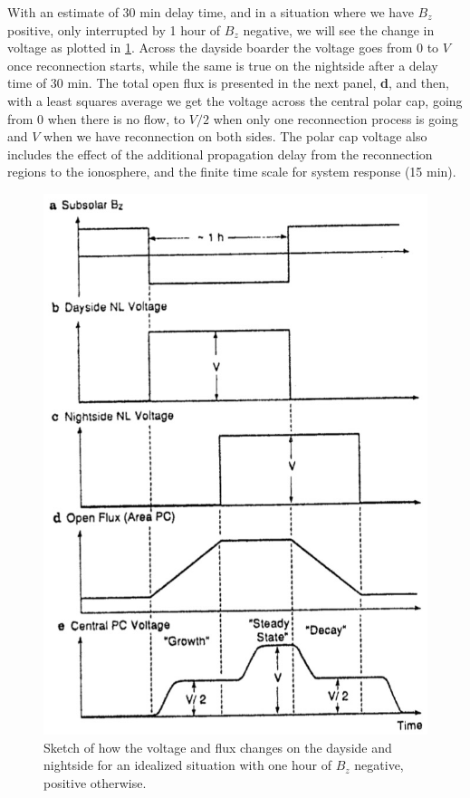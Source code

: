 With an estimate of 30 min delay time, and in a situation where we have \(B_z\) positive, only interrupted by 1 hour of \(B_z\) negative, we will see the change in voltage as plotted in \cref{fig:L13_voltage_dependance_flux_flow}. Across the dayside boarder the voltage goes from 0 to \(V\) once reconnection starts, while the same is true on the nightside after a delay time of 30 min. The total open flux is presented in the next panel, \textbf{d}, and then, with a least squares average we get the voltage across the central polar cap, going from 0 when there is no flow, to \(V/2\) when only one reconnection process is going and \(V\) when we have reconnection on both sides. The polar cap voltage also includes the effect of the additional propagation delay from the reconnection regions to the ionosphere, and the finite time scale for system response (15 min).
\begin{figure}[t]
    \centering
    \includegraphics[width=.4\linewidth]{bilder/L13_voltage_dependance_flux_flow.jpg}
    \caption{Sketch of how the voltage and flux changes on the dayside and nightside for an idealized situation with one hour of \(B_z\) negative, positive otherwise.}\label{fig:L13_voltage_dependance_flux_flow}
\end{figure}

